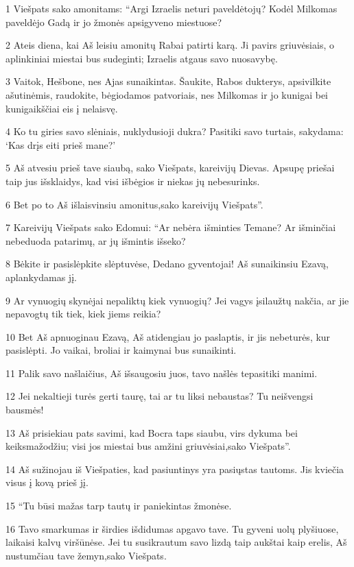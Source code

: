 \par 1 Viešpats sako amonitams: “Argi Izraelis neturi paveldėtojų? Kodėl Milkomas paveldėjo Gadą ir jo žmonės apsigyveno miestuose? 
\par 2 Ateis diena, kai Aš leisiu amonitų Rabai patirti karą. Ji pavirs griuvėsiais, o aplinkiniai miestai bus sudeginti; Izraelis atgaus savo nuosavybę. 
\par 3 Vaitok, Hešbone, nes Ajas sunaikintas. Šaukite, Rabos dukterys, apsivilkite ašutinėmis, raudokite, bėgiodamos patvoriais, nes Milkomas ir jo kunigai bei kunigaikščiai eis į nelaisvę. 
\par 4 Ko tu giries savo slėniais, nuklydusioji dukra? Pasitiki savo turtais, sakydama: ‘Kas drįs eiti prieš mane?’ 
\par 5 Aš atvesiu prieš tave siaubą,­ sako Viešpats, kareivijų Dievas.­ Apsupę priešai taip jus išsklaidys, kad visi išbėgios ir niekas jų nebesurinks. 
\par 6 Bet po to Aš išlaisvinsiu amonitus,­sako kareivijų Viešpats”. 
\par 7 Kareivijų Viešpats sako Edomui: “Ar nebėra išminties Temane? Ar išminčiai nebeduoda patarimų, ar jų išmintis išseko? 
\par 8 Bėkite ir pasislėpkite slėptuvėse, Dedano gyventojai! Aš sunaikinsiu Ezavą, aplankydamas jį. 
\par 9 Ar vynuogių skynėjai nepaliktų kiek vynuogių? Jei vagys įsilaužtų nakčia, ar jie nepavogtų tik tiek, kiek jiems reikia? 
\par 10 Bet Aš apnuoginau Ezavą, Aš atidengiau jo paslaptis, ir jis nebeturės, kur pasislėpti. Jo vaikai, broliai ir kaimynai bus sunaikinti. 
\par 11 Palik savo našlaičius, Aš išsaugosiu juos, tavo našlės tepasitiki manimi. 
\par 12 Jei nekaltieji turės gerti taurę, tai ar tu liksi nebaustas? Tu neišvengsi bausmės! 
\par 13 Aš prisiekiau pats savimi, kad Bocra taps siaubu, virs dykuma bei keiksmažodžiu; visi jos miestai bus amžini griuvėsiai,­sako Viešpats”. 
\par 14 Aš sužinojau iš Viešpaties, kad pasiuntinys yra pasiųstas tautoms. Jis kviečia visus į kovą prieš jį. 
\par 15 “Tu būsi mažas tarp tautų ir paniekintas žmonėse. 
\par 16 Tavo smarkumas ir širdies išdidumas apgavo tave. Tu gyveni uolų plyšiuose, laikaisi kalvų viršūnėse. Jei tu susikrautum savo lizdą taip aukštai kaip erelis, Aš nustumčiau tave žemyn,­sako Viešpats.­ 
